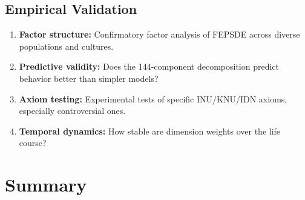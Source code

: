\subsection{Empirical Validation}

\begin{enumerate}
    \item \textbf{Factor structure:} Confirmatory factor analysis of FEPSDE 
    across diverse populations and cultures.
    
    \item \textbf{Predictive validity:} Does the 144-component decomposition 
    predict behavior better than simpler models?
    
    \item \textbf{Axiom testing:} Experimental tests of specific INU/KNU/IDN 
    axioms, especially controversial ones.
    
    \item \textbf{Temporal dynamics:} How stable are dimension weights over 
    the life course?
\end{enumerate}


\section{Summary}
\label{sec:app-c-summary}

